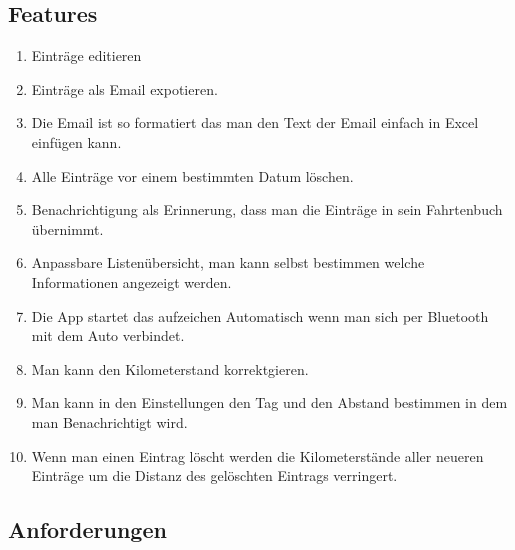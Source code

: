 \documentclass[a4paper]{article}
\begin{document}
\subsection{Features}
\begin{enumerate}
	\item Einträge editieren
	\item Einträge als Email expotieren.
	\item Die Email ist so formatiert das man den Text der Email einfach in Excel einfügen kann.
	\item Alle Einträge vor einem bestimmten Datum löschen.
	\item Benachrichtigung als Erinnerung, dass man die Einträge in sein Fahrtenbuch übernimmt.
	\item Anpassbare Listenübersicht, man kann selbst bestimmen welche Informationen angezeigt werden.
	\item Die App startet das aufzeichen Automatisch wenn man sich per Bluetooth mit dem Auto verbindet.
	\item Man kann den Kilometerstand korrektgieren.
	\item Man kann in den Einstellungen den Tag und den Abstand bestimmen in dem man Benachrichtigt wird.
	\item Wenn man einen Eintrag löscht werden die Kilometerstände aller neueren Einträge um die Distanz des gelöschten Eintrags verringert.
\end{enumerate}

\subsection{Anforderungen}
\end{document}
